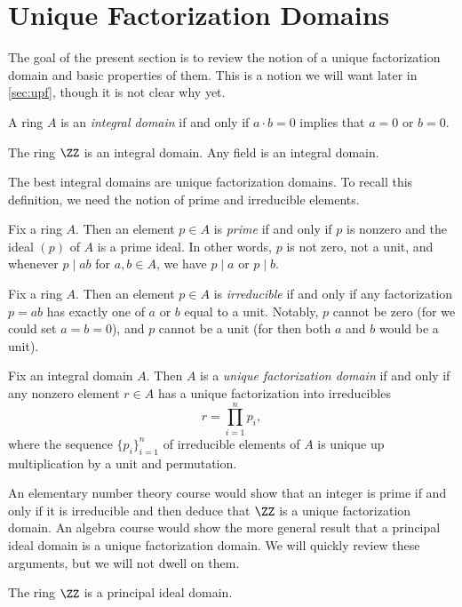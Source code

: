 \documentclass[../notes.tex]{subfiles}
\begin{document}
\section{Unique Factorization Domains}
The goal of the present section is to review the notion of a unique factorization domain and basic properties of them. This is a notion we will want later in \cref{sec:upf}, though it is not clear why yet.
\begin{definition}
	A ring $A$ is an \textit{integral domain} if and only if $a\cdot b=0$ implies that $a=0$ or $b=0$.
\end{definition}
\begin{example}
	The ring $\ZZ$ is an integral domain. Any field is an integral domain.
\end{example}
The best integral domains are unique factorization domains. To recall this definition, we need the notion of prime and irreducible elements.
\begin{definition}[prime]
	Fix a ring $A$. Then an element $p\in A$ is \textit{prime} if and only if $p$ is nonzero and the ideal $(p)$ of $A$ is a prime ideal. In other words, $p$ is not zero, not a unit, and whenever $p\mid ab$ for $a,b\in A$, we have $p\mid a$ or $p\mid b$.
\end{definition}
\begin{definition}[irreducible]
	Fix a ring $A$. Then an element $p\in A$ is \textit{irreducible} if and only if any factorization $p=ab$ has exactly one of $a$ or $b$ equal to a unit. Notably, $p$ cannot be zero (for we could set $a=b=0$), and $p$ cannot be a unit (for then both $a$ and $b$ would be a unit).
\end{definition}
\begin{definition}
	Fix an integral domain $A$. Then $A$ is a \textit{unique factorization domain} if and only if any nonzero element $r\in A$ has a unique factorization into irreducibles
	\[r=\prod_{i=1}^np_i,\]
	where the sequence $\{p_i\}_{i=1}^n$ of irreducible elements of $A$ is unique up multiplication by a unit and permutation.
\end{definition}
An elementary number theory course would show that an integer is prime if and only if it is irreducible and then deduce that $\ZZ$ is a unique factorization domain. An algebra course would show the more general result that a principal ideal domain is a unique factorization domain. We will quickly review these arguments, but we will not dwell on them.
\begin{proposition}
	The ring $\ZZ$ is a principal ideal domain.
\end{proposition}
\end{document}
